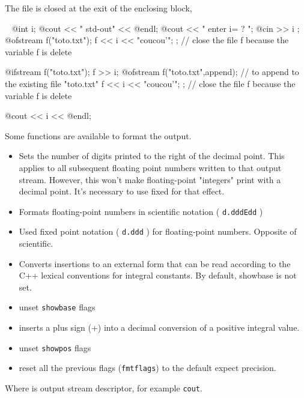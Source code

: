 \documentclass[a4paper,twoside,12pt]{book}
\def\n{\nabla}
\begin{document}
\begin{note} The file is closed
at the exit of the enclosing block,
\end{note}
\begin{example}~
\label{exm:io}
\bFF
@int i;
@cout << " std-out" << @endl;
@cout << " enter i= ? ";
@cin >> i ;
{
  @ofstream f("toto.txt");
  f << i << "coucou'\n";
}; //  close the file f because the variable f is delete

{
  @ifstream f("toto.txt");
   f >> i;
}
{
  @ofstream f("toto.txt",append);
     // to append to the existing file "toto.txt"
  f << i << "coucou'\n";
}; //  close the file f because the variable f is delete

  @cout << i << @endl;
\eFF



  

Some functions are available  to format the output.
\begin{itemize}
\item {} Sets the number of digits printed to the right of the decimal point. This applies to all subsequent floating point numbers written to that output stream. However, this won't make floating-point "integers" print with a decimal point. It's necessary to use fixed for that effect.
\item     {}  Formats floating-point numbers in scientific notation (  \texttt{d.dddEdd} )
\item     {}          Used fixed point notation (  \texttt{d.ddd} ) for floating-point numbers. Opposite of scientific.
\item     {}    Converts insertions to an external form that can be read according to the C++ lexical conventions for integral constants. By default, showbase is not set.
\item     {}   unset \texttt{showbase} flags
\item     {}    inserts a plus sign (+) into a decimal conversion of a positive integral value.
\item     {}  unset \texttt{showpos} flags
 \item   {}     reset all  the previous  flags (\texttt{fmtflags}) to the  default expect precision.
\end{itemize}
Where  is output stream descriptor, for example \texttt{cout}.


\end{example}
\end{document}
